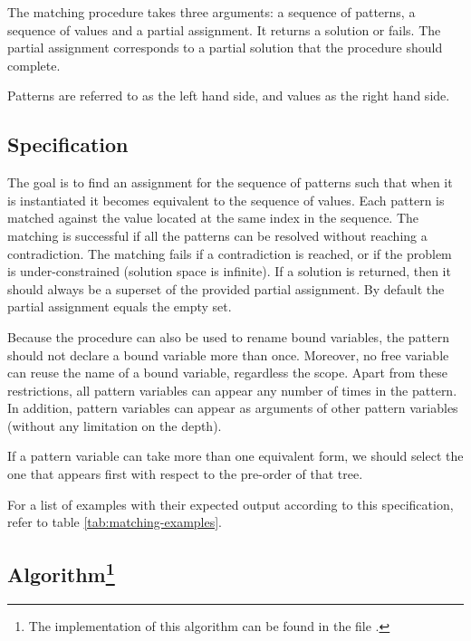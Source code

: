 The matching procedure takes three arguments: a sequence of patterns, a sequence of values and a partial assignment. It returns a solution or fails. The partial assignment corresponds to a partial solution that the procedure should complete.

Patterns are referred to as the left hand side, and values as the right hand side.

\subsection{Specification}

The goal is to find an assignment for the sequence of patterns such that when it is instantiated it becomes equivalent to the sequence of values. Each pattern is matched against the value located at the same index in the sequence. The matching is successful if all the patterns can be resolved without reaching a contradiction. The matching fails if a contradiction is reached, or if the problem is under-constrained (solution space is infinite). If a solution is returned, then it should always be a superset of the provided partial assignment. By default the partial assignment equals the empty set.

Because the procedure can also be used to rename bound variables, the pattern should not declare a bound variable more than once. Moreover, no free variable can reuse the name of a bound variable, regardless the scope. Apart from these restrictions, all pattern variables can appear any number of times in the pattern. In addition, pattern variables can appear as arguments of other pattern variables (without any limitation on the depth).

If a pattern variable can take more than one equivalent form, we should select the one that appears first with respect to the pre-order of that tree.

For a list of examples with their expected output according to this specification, refer to table \ref{tab:matching-examples}.

\subsection{Algorithm\texorpdfstring{\footnote{The implementation of this algorithm can be found in the file \href{https://github.com/FlorianCassayre/master-project/blob/master/src/main/scala/me/cassayre/florian/masterproject/front/proof/unification/UnificationUtils.scala}{}.}}{Lg}}

